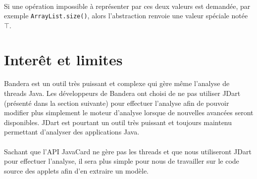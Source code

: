 \paragraph{}
Si une opération impossible à représenter par ces deux valeurs est
demandée, par exemple \verb|ArrayList.size()|, alors l'abstraction
renvoie une valeur spéciale notée $\top$.

\section{Interêt et limites}

\paragraph{}
Bandera est un outil très puissant et complexe qui gère même l'analyse
de threads Java. Les développeurs de Bandera ont choisi de ne pas
utiliser JDart (présenté dans la section suivante) pour effectuer
l'analyse afin de pouvoir modifier plus simplement le moteur d'analyse
lorsque de nouvelles avancées seront disponibles. JDart est pourtant
un outil très puissant et toujours maintenu permettant d'analyser des
applications Java.

\paragraph{}
Sachant que l'API JavaCard ne gère pas les threads et que nous
utiliseront JDart pour effectuer l'analyse, il sera plus simple pour
nous de travailler sur le code source des applets afin d'en extraire
un modèle.
